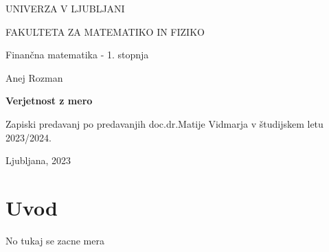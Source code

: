 \documentclass[12pt, a4paper]{article}
\begin{document}
\begin{titlepage}
    UNIVERZA V LJUBLJANI
  
    FAKULTETA ZA MATEMATIKO IN FIZIKO
  
    \vspace{0.5cm}
    Finančna matematika - 1. stopnja
  
    \begin{center}
        \vspace{7cm}
            Anej Rozman
  
        \vspace{0.4cm}
        \textbf{\Large{Verjetnost z mero}}
        \vspace{0.3cm}
  
        Zapiski predavanj po predavanjih doc.\@ dr.\@ Matije Vidmarja v študijskem letu 2023/2024.
    \end{center}
    \vfill
        Ljubljana, 2023     
    \thispagestyle{empty}
\end{titlepage}

\newpage
  
\tableofcontents
   
\newpage
    
\section*{Uvod}
No tukaj se zacne mera
\end{document}
